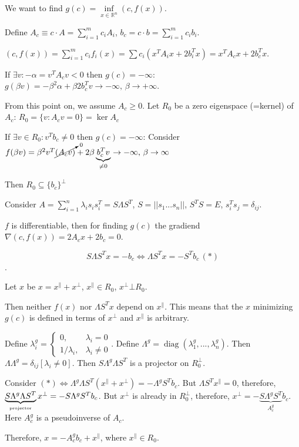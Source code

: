 \documentclass[a4paper]{article}
\DeclareMathOperator{\diag}{diag}
\begin{document}
We want to find
$g(c)=\inf\limits_{x\in\mathbb{R}^n} (c,f(x))$.

Define $A_c\equiv c\cdot A=\sum\limits_{i=1}^m c_iA_i$, $b_c=c\cdot b=\sum\limits_{i=1}^m c_ib_i$.

$(c,f(x))=\sum\limits_{i=1}^m c_i f_i(x)=\sum c_i (x^TA_ix+2b_i^Tx)=x^TA_cx+2b_c^Tx$.

If $\exists v\colon -\alpha=v^TA_cv<0$ then $g(c)=-\infty$:
$g(\beta v)=-\beta^2\alpha+\beta 2b_c^Tv\to-\infty,\,\beta\to+\infty$.

From this point on, we assume $A_c\geqslant 0$. Let $R_0$ be a zero eigenspace (=kernel) of $A_c$: $R_0=\{v\colon A_cv=0\}=\ker A_c$

If $\exists v\in R_0\colon v^Tb_c\neq 0$ then $g(c)=-\infty$: Consider $f(\beta v)=\beta^2 v^T\cancelto{0}{(A_cv)}+2\beta \underbrace{b_c^Tv}_{\neq 0}\to-\infty,\, \beta\to\infty$

Then $R_0\subseteq \{b_c\}^\bot$

Consider $A=\sum\limits_{i=1}^n \lambda_i s_is_i^T=S\Lambda S^T$, $S=||s_1 ... s_n ||$, $S^TS=E$, $s_i^Ts_j=\delta_{ij}$.

$f$ is differentiable, then for finding $g(c)$ the gradiend $\nabla (c,f(x))=2A_cx+2b_c=0$.

$$S\Lambda S^Tx=-b_c\Leftrightarrow \Lambda S^Tx=-S^Tb_c\, (*)$$.

Let $x$ be $x=x^{\parallel}+x^\bot$, $x^{\parallel}\in R_0$, $x^\bot \bot R_0$.

Then neither $f(x)$ nor $\Lambda S^T x$ depend on $x^{\parallel}$. This means that the $x$ minimizing $g(c)$ is defined in terms of $x^{\bot}$ and $x^{\parallel}$ is arbitrary.

Define $\lambda^g_i=\begin{cases}
0,&\lambda_i=0\\
1/\lambda_i,&\lambda_i\neq 0
\end{cases}$. Define $\Lambda^g=\diag(\lambda^g_1,...,\lambda^g_n)$. Then $\Lambda \Lambda^g=\delta_{ij}[\lambda_i\neq 0]$. Then $S\Lambda^g\Lambda S^T$ is a projector on $R_0^\bot$.

Consider $(*) \Leftrightarrow \Lambda^g\Lambda S^T(x^\parallel+x^\bot)=-\Lambda^gS^Tb_c$. But $\Lambda S^Tx^\parallel=0$, therefore, $\underbrace{S\Lambda^g\Lambda S^T}_{\mbox{\tiny projector}}x^\bot=-S\Lambda^gS^Tb_c$. But $x^\bot$ is already in $R_0^\bot$, therefore, $x^\bot=-\underbrace{S\Lambda^gS^T}_{A^g_c}b_c$. Here $A_c^g$ is a pseudoinverse of $A_c$.

Therefore, $\boxed{x=-A_c^gb_c+x^\parallel}$, where $x^\parallel\in R_0$.
\end{document}
